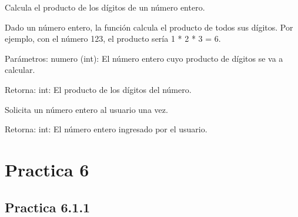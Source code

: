 \documentclass[letterpaper,10pt,spanish]{sphinxmanual}
\begin{document}
\begin{fulllineitems}
\label{\detokenize{pr5:pr5.11.calcular_producto_digitos}}
\pysigstartsignatures
{}
\pysigstopsignatures
\sphinxAtStartPar
Calcula el producto de los dígitos de un número entero.

\sphinxAtStartPar
Dado un número entero, la función calcula el producto de todos sus dígitos.
Por ejemplo, con el número 123, el producto sería 1 * 2 * 3 = 6.

\sphinxAtStartPar
Parámetros:
numero (int): El número entero cuyo producto de dígitos se va a calcular.

\sphinxAtStartPar
Retorna:
int: El producto de los dígitos del número.

\end{fulllineitems}


\begin{fulllineitems}
\label{\detokenize{pr5:pr5.11.obtener_numero}}
\pysigstartsignatures
{}
\pysigstopsignatures
\sphinxAtStartPar
Solicita un número entero al usuario una vez.

\sphinxAtStartPar
Retorna:
int: El número entero ingresado por el usuario.

\end{fulllineitems}


\sphinxstepscope


\chapter{Practica 6}
\label{\detokenize{pr6:practica-6}}\label{\detokenize{pr6::doc}}

\section{Practica 6.1.1}
\label{\detokenize{pr6:module-pr6.1_1}}\label{\detokenize{pr6:practica-6-1-1}}
\end{document}
